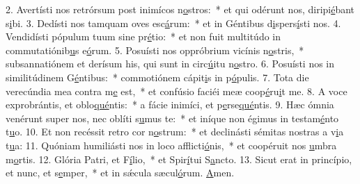 2. Avertísti nos retrórsum post inimícos n\uline{o}stros:~* et qui odérunt nos, diripi\uline{é}bant s\uline{i}bi.
3. Dedísti nos tamquam oves esc\uline{á}rum:~* et in Géntibus d\uline{i}spers\uline{í}sti nos.
4. Vendidísti pópulum tuum sine pr\uline{é}tio:~* et non fuit multitúdo in commutatiónib\uline{u}s e\uline{ó}rum.
5. Posuísti nos oppróbrium vicínis n\uline{o}stris,~* subsannatiónem et derísum his, qui sunt in circ\uline{ú}itu n\uline{o}stro.
6. Posuísti nos in similitúdinem G\uline{é}ntibus:~* commotiónem cápit\uline{i}s in p\uline{ó}pulis.
7. Tota die verecúndia mea contra m\uline{e} est,~* et confúsio faciéi meæ coop\uline{é}ru\uline{i}t me.
8. A voce exprobrántis, et oblo\uline{qué}ntis:~* a fácie inimíci, et p\uline{e}rse\uline{qué}ntis.
9. Hæc ómnia venérunt super nos, nec oblíti s\uline{u}mus te:~* et iníque non égimus in testam\uline{é}nto t\uline{u}o.
10. Et non recéssit retro cor n\uline{o}strum:~* et declinásti sémitas nostras a v\uline{i}a t\uline{u}a:
11. Quóniam humiliásti nos in loco afflicti\uline{ó}nis,~* et coopéruit nos \uline{u}mbra m\uline{o}rtis.
12. Glória Patri, et F\uline{í}lio,~* et Spir\uline{í}tui S\uline{a}ncto.
13. Sicut erat in princípio, et nunc, et s\uline{e}mper,~* et in sǽcula sæcul\uline{ó}rum. \uline{A}men.
